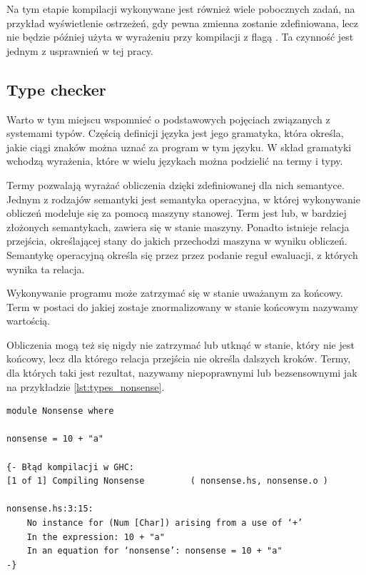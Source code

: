 {Na tym etapie kompilacji wykonywane jest również wiele pobocznych zadań, na
przykład wyświetlenie ostrzeżeń, gdy pewna zmienna zostanie zdefiniowana, lecz
nie będzie później użyta w wyrażeniu przy kompilacji z flagą
. Ta czynność jest jednym z usprawnień w tej pracy.

\subsection{Type checker}\label{sec:type_checker}

Warto w tym miejscu wspomnieć o podstawowych pojęciach związanych z systemami
typów. Częścią definicji języka jest jego gramatyka, która określa, jakie ciągi
znaków można uznać za program w tym języku. W skład gramatyki wchodzą wyrażenia,
które w wielu językach można podzielić na termy i typy.

Termy pozwalają wyrażać obliczenia dzięki zdefiniowanej dla nich semantyce.
Jednym z rodzajów semantyki jest semantyka operacyjna, w której wykonywanie
obliczeń modeluje się za pomocą maszyny stanowej. Term jest lub, w bardziej
złożonych semantykach, zawiera się w stanie maszyny. Ponadto istnieje relacja
przejścia, określającej stany do jakich przechodzi maszyna w wyniku obliczeń.
Semantykę operacyjną określa się przez przez podanie reguł ewaluacji, z których
wynika ta relacja.

Wykonywanie programu może zatrzymać się w stanie uważanym za końcowy. Term
w postaci do jakiej zostaje znormalizowany w stanie końcowym nazywamy wartością.

Obliczenia mogą też się nigdy nie zatrzymać lub utknąć w stanie, który nie jest
końcowy, lecz dla którego relacja przejścia nie określa dalszych kroków.
Termy, dla których taki jest rezultat, nazywamy niepoprawnymi lub
bezsensownymi\cite{TAPL} jak na przykładzie \ref{lst:types_nonsense}.

\begin{lstlisting}[float,label={lst:types_nonsense},
                   caption={Przykład bezsensownego wyrażenia w programie, z błędem GHC, który wywołuje.}]
module Nonsense where

nonsense = 10 + "a"

{- Błąd kompilacji w GHC:
[1 of 1] Compiling Nonsense         ( nonsense.hs, nonsense.o )

nonsense.hs:3:15:
    No instance for (Num [Char]) arising from a use of ‘+’
    In the expression: 10 + "a"
    In an equation for ‘nonsense’: nonsense = 10 + "a"
-}
\end{lstlisting}

}
